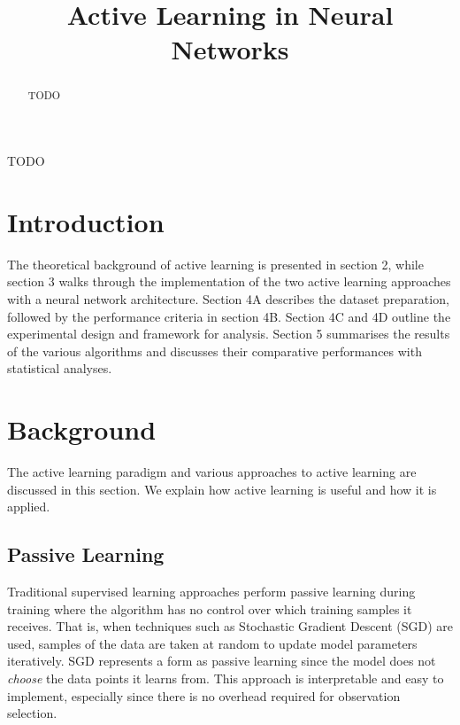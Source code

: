 \documentclass[10pt, conference]{IEEEtran}
\begin{document}
\title{Active Learning in Neural Networks\\

}

\author{
}

\maketitle

\begin{abstract}
TODO
\end{abstract}

\begin{IEEEkeywords}
TODO
\end{IEEEkeywords}

\section{Introduction}


The theoretical background of active learning is presented in section 2, while section 3 walks through the implementation of the two active learning approaches with a neural network architecture. Section 4A describes the dataset preparation, followed by the performance criteria in section 4B. Section 4C and 4D outline the experimental design and framework for analysis. Section 5 summarises the results of the various algorithms and discusses their comparative performances with statistical analyses.

\section{Background}
The active learning paradigm and various approaches to active learning are discussed in this section. We explain how active learning is useful and how it is applied.

\subsection{Passive Learning}
Traditional supervised learning approaches perform passive learning during training where the algorithm has no control over which training samples it receives. That is, when techniques such as Stochastic Gradient Descent (SGD) are used, samples of the data are taken at random to update model parameters iteratively. SGD represents a form as passive learning since the model does not \textit{choose} the data points it learns from. This approach is interpretable and easy to implement, especially since there is no overhead required for observation selection.
\end{document}
